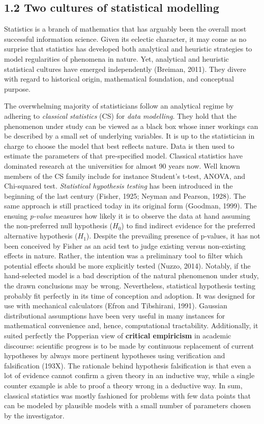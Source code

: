 \documentclass[authoryear,review,3p]{elsarticle}
\begin{document}
\subsection*{1.2 Two cultures of statistical modelling}

Statistics is a branch of mathematics that has arguably been the
overall most successful information science.
%
Given its eclectic character, it may come as no surprise that statistics
has developed both analytical and heuristic strategies
to model regularities of phenomena in nature.
Yet, analytical and heuristic statistical cultures
have emerged independently (Breiman, 2011).
They divere with regard to historical origin, mathematical foundation,
and conceptual purpose.

The overwhelming majority of statisticians
follow an analytical regime by
adhering to \textit{classical statistics} (CS) for
\textit{data modelling}.
They hold that the phenomenon under study can be viewed as a black box
whose inner workings can be described by a small set of
underlying variables.
It is up to the statistician in charge
to choose the model that best reflects nature.
Data is then used to estimate the parameters of that pre-specified model.
Classical statistics have dominated research at the universities
for almost 90 years now.
%
Well known members of the CS family include for instance
Student's t-test, ANOVA,
and Chi-squared test.
\textit{Statistical hypothesis testing} has been introduced in the beginning
of the last century (Fisher, 1925; Neyman and Pearson, 1928).
The same approach is still practiced today in its original form (Goodman, 1999).  
%
The ensuing \textit{p-value} measures how likely it is
to observe the data at hand
assuming the non-preferred null hypothesis ($H_0$)
to find indirect evidence
for the preferred alternative hypothesis ($H_1$).
%
Despite the prevailing presence of p-values,
it has not been conceived by Fisher as an acid test
to judge existing versus non-existing effects in nature.
Rather, the intention was a preliminary tool to
filter which potential effects should be more explicitly tested (Nuzzo, 2014).
%
Notably, if the hand-selected model is a bad description of
the natural phenomenon under study,
the drawn conclusions may be wrong.
%
Nevertheless, statistical hypothesis testing probably fit perfectly
in its time of conception and adoption.
It was designed for use with mechanical calculators
(Efron and Tibshirani, 1991). Gaussian distributional assumptions
have been very useful in many instances for
mathematical convenience and, hence, computational tractability.
Additionally, it suited perfectly the Popperian view of
\textbf{critical empiricism} in academic discourse:
scientific progress is to be made by continuous replacement of current
hypotheses by always more pertinent hypotheses
using verification and falsification (193X).
The rationale behind hypothesis falsification
is that even a lot of evidence cannot confirm
a given theory in an inductive way, 
while a single counter example is able to proof a theory wrong in a deductive way.
%
In sum,
classical statistics was mostly fashioned
for problems with few data points that can be modeled 
by plausible models with a small number of parameters chosen by the
investigator.
\end{document}
